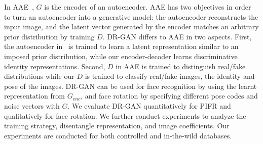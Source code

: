 \documentclass[10pt,journal,compsoc]{IEEEtran}
\begin{document}
In AAE~\cite{makhzani2015adversarial}, $G$ is the encoder of an autoencoder. 
AAE has two objectives in order to turn an autoencoder into a generative model: the autoencoder reconstructs the input image, and the latent vector generated by the encoder matches an arbitrary prior distribution by training $D$. 
DR-GAN differs to AAE in two aspects. 
First, the autoencoder in~\cite{makhzani2015adversarial} is trained to learn a latent representation similar to an imposed prior distribution, while our encoder-decoder learns discriminative identity representations. 
Second, $D$ in AAE is trained to distinguish real/fake distributions while our $D$ is trained to classify real/fake images, the identity and pose of the images. %
DR-GAN can be used for face recognition by using the learnt representation from $G_{enc}$, and face rotation by specifying different pose codes and noise vectors with $G$. 
We evaluate DR-GAN quantitatively for PIFR and qualitatively for face rotation. 
We further conduct experiments to analyze the training strategy, disentangle representation, and image coefficients.  
Our experiments are conducted for both controlled and in-the-wild databases. 
\end{document}
